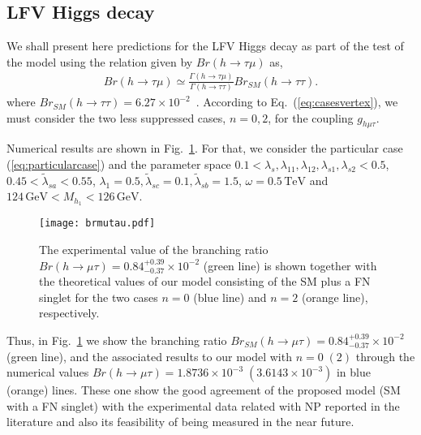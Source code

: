 \documentclass[aps,prd,groupaddress,floatfix,tighten,nofootinbib,showpacs,
amsfonts,superscriptaddress]{revtex4}
\begin{document}
{%

\subsection{LFV Higgs decay\label{Sec:LFV-H-decays}}
We shall present here predictions for the LFV Higgs decay as part of the test of the model using the relation given by $Br(h \to \tau\mu)$ as,
%
\begin{eqnarray}
Br(h \to \tau\mu) \simeq \frac{\Gamma(h\to \tau\mu)}{\Gamma (h \to \tau\tau)} Br_{SM}(h \to \tau\tau).
\end{eqnarray}
where $Br_{SM}(h \to \tau\tau)= 6.27\times10^{-2}$~\cite{Olive:2016xmw}. According to Eq.~(\ref{eq:casesvertex}), we must consider the two less suppressed cases, $n=0,2$, for the coupling $g_{h\mu\tau}$.

Numerical results are shown in Fig.~\ref{Fig:brmutaumodel}. For that, we consider the particular case (\ref{eq:particularcase})  and the parameter space 
$0.1<\lambda_s,\lambda_{11},\lambda_{12},\lambda_{s1},\lambda_{s2}<0.5$, $0.45<\tilde{\lambda}_{sa}<0.55$, 
$\lambda_{1}=0.5, \tilde{\lambda}_{sc}=0.1,\tilde{\lambda}_{sb}=1.5$, 
$\omega=0.5\,{\textrm{TeV}}$ and $124\,\textrm{GeV}<M_{h_1}<126\,\textrm{GeV}$.
%
\begin{figure}[!htbp]
\texttt{[image: brmutau.pdf]}
  \caption{The experimental value of the branching ratio $Br(h \to \mu\tau)= 0.84^{+0.39}_{-0.37}\times10^{-2}$ (green line) is shown together with the theoretical values of 
 our model consisting of the SM plus a FN singlet for the two cases $n=0$ (blue line) and $n=2$ (orange line), respectively.}
   \label{Fig:brmutaumodel}
\end{figure}
%
Thus, in Fig.~\ref{Fig:brmutaumodel} we show the branching ratio $Br_{SM}(h \to \mu\tau)= 0.84^{+0.39}_{-0.37}\times10^{-2}$ (green line), and the associated results to our model with $n=0 \; (2)$ through the numerical values $Br(h \to \mu\tau)= 1.8736\times10^{-3} \;(3.6143\times10^{-3})$ in blue (orange) lines. These one show  the good agreement of the proposed model (SM with a FN singlet) with the experimental data related with NP reported in the literature and also its feasibility of being measured in the near future.

}
\end{document}

